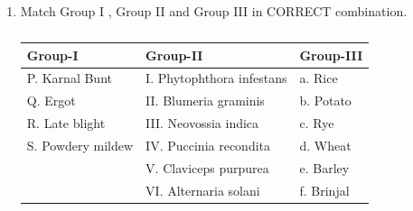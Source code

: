 \documentclass[journal,12pt,onecolumn]{IEEEtran}
\theoremstyle{remark}
\begin{document}
\begin{enumerate}
    \begin{enumerate}
    \end{enumerate}

    \item Match Group I , Group II  and Group III  in CORRECT combination.

    \hfill{}

    \begin{table}[h!]
    \centering
    \caption*{}
    \label{tab:q60}
    \begin{tabular}{lll}
    \hline
    \textbf{Group-I} & \textbf{Group-II} & \textbf{Group-III} \\
    \hline
    P. Karnal Bunt & I. Phytophthora infestans & a. Rice \\
    Q. Ergot & II. Blumeria graminis & b. Potato \\
    R. Late blight & III. Neovossia indica & c. Rye \\
    S. Powdery mildew & IV. Puccinia recondita & d. Wheat \\
     & V. Claviceps purpurea & e. Barley \\
     & VI. Alternaria solani & f. Brinjal \\
    \hline
    \end{tabular}
    \end{table}

    \begin{enumerate}
    \end{enumerate}


\end{enumerate}
\end{document}
